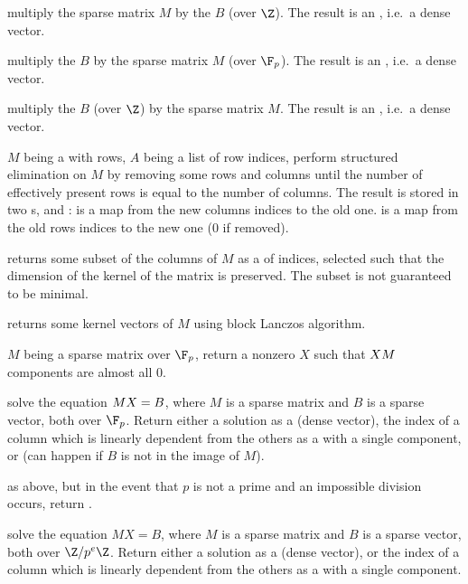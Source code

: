  multiply the sparse matrix $M$
by the  $B$ (over $\Z$). The result is an , i.e.~a
dense vector.

 multiply the  $B$
by the sparse matrix $M$ (over $\F_p$). The result is an , i.e.~a
dense vector.

 multiply the   $B$ (over
$\Z$) by the sparse matrix $M$. The result is an , i.e.~a
dense vector.

$M$ being a  with  rows, $A$ being a list of row indices,
perform structured elimination on $M$ by removing some rows and columns until
the number of effectively present rows is equal to the number of columns.
The result is stored in two s,  and :
 is a map from the new columns indices to the old one.
 is a map from the old rows indices to the new one ($0$ if removed).

 returns some subset of the columns
of $M$ as a  of indices, selected such that the dimension of the
kernel of the matrix is preserved. The subset is not guaranteed to be minimal.

 returns some kernel vectors of $M$
using block Lanczos algorithm.

$M$ being a sparse matrix over $\F_p$, return a nonzero  $X$ such
that $X\*M$ components are almost all $0$.

solve the equation $M\*X = B$, where $M$ is a sparse matrix and $B$ is a sparse
vector, both over $\F_p$. Return either a solution as a  (dense
vector), the index of a column which is linearly dependent from the
others as a  with a single component, or 
(can happen if $B$ is not in the image of $M$).

as above, but in the event that $p$ is not a prime and an impossible division
occurs, return .

solve the equation $MX = B$, where $M$ is a sparse matrix and $B$ is a sparse
vector, both over $\Z/p^e\Z$. Return either a solution as a  (dense
vector), or the index of a column which is linearly dependent from the
others as a  with a single component.

